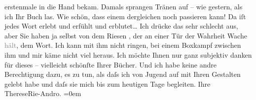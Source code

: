 \begin{ledgroupsized}[t]{13cm}
                    erstenmale in die Hand bekam. Damals sprangen Tränen auf – wie gestern, als ich
                    Ihr Buch las. Wie schön,
                    dass einem dergleichen noch passieren kann! Da iſt jedes Wort erlebt und erfühlt
                    und erblutet{\dots} Ich drücke das sehr schlecht aus, aber
                    Sie haben ja selbst von dem Riesen \label{K_L02568-1v}\label{K_L02568-1h}, der an einer Tür der Wahrheit Wache
                        \textcolor{gray}{hält}, dem Wort. Ich kann mit ihm nicht ringen, bei einem
                    Boxkampf zwischen ihm und mir käme nicht viel heraus. Ich möchte Ihnen nur ganz
                    subjektiv danken für dieses – vielleicht schönſte Ihrer Bücher. Und ich habe
                    keine andre Berechtigung dazu, es zu tun, als daſs ich von Jugend auf mit Ihren
                    Gestalten gelebt habe und daſs sie mich bis zum heutigen Tage begleiten.\pend
           \pstart
           Ihre{\\[\baselineskip]}\spacefill\mbox{ThereseRie-Andro.}\pend
           \leftskip=0em{}\endnumbering{}\end{ledgroupsized}  \newcommand{\dateiname}{L02568}\newcommand{\titel}{Therese Rie-Andro an Arthur Schnitzler, 25. 12. 1927}\newcommand{\editorInnen}{Martin Anton Müller und Gerd-Hermann Susen}
      